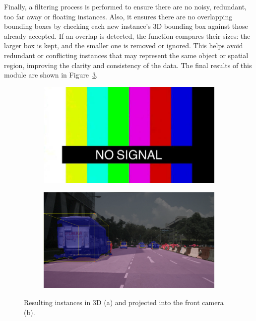 Finally, a filtering process is performed to ensure there are no noisy, redundant, too far away or floating instances. Also, it ensures there are no overlapping bounding boxes by checking each new instance's 3D bounding box against those already accepted. If an overlap is detected, the function compares their sizes: the larger box is kept, and the smaller one is removed or ignored. This helps avoid redundant or conflicting instances that may represent the same object or spatial region, improving the clarity and consistency of the data. The final results of this module are shown in Figure~\ref{fig:instance_scene_images}.

\begin{figure}[h!]
    \centering
    \begin{subfigure}[b]{0.45\textwidth}
        \includegraphics[width=\textwidth]{images/shared/no_signal.jpg}
        \caption{}
        \label{fig:instance_scene_images_a}
    \end{subfigure}
    \hfill
    \begin{subfigure}[b]{0.45\textwidth}
        \includegraphics[width=\textwidth]{images/methodology/raw_cuboid_1.png}
        \caption{}
        \label{fig:instance_scene_images_b}
    \end{subfigure}

    \caption{Resulting instances in 3D (a) and projected into the front camera (b).}
    \label{fig:instance_scene_images}
\end{figure}


